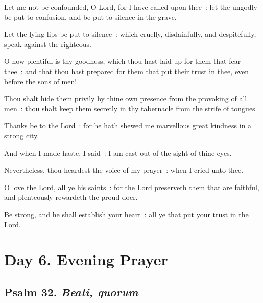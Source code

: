 Let me not be confounded, O Lord, for I have called upon thee~: let the ungodly be put to confusion, and be put to silence in the grave.\par
{}Let the lying lips be put to silence~: which cruelly, disdainfully, and despitefully, speak against the righteous.\par
{}O how plentiful is thy goodness, which thou hast laid up for them that fear thee~: and that thou hast prepared for them that put their trust in thee, even before the sons of men!\par
{}Thou shalt hide them privily by thine own presence from the provoking of all men~: thou shalt keep them secretly in thy tabernacle from the strife of tongues.\par
{}Thanks be to the Lord~: for he hath shewed me marvellous great kindness in a strong city.\par
{}And when I made haste, I said~: I am cast out of the sight of thine eyes.\par
{}Nevertheless, thou heardest the voice of my prayer~: when I cried unto thee.\par
{}O love the Lord, all ye his saints~: for the Lord preserveth them that are faithful, and plenteously rewardeth the proud doer.\par
{}Be strong, and he shall establish your heart~: all ye that put your trust in the Lord.\par

\section*{Day 6. Evening Prayer}

\subsection{Psalm 32. \textit{Beati, quorum}}

